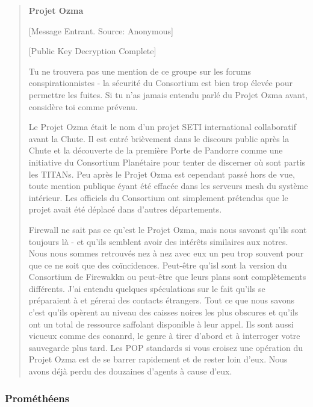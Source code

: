                                              \begin{quotation} \textbf{Projet Ozma} 

                                                [Message Entrant. Source: Anonymous] 

                                                [Public Key Decryption Complete] 

                                                Tu ne trouvera pas une mention de ce groupe sur les forums conspirationnistes - la sécurité du Consortium est bien trop élevée pour permettre les fuites. Si tu n'as jamais entendu parlé du Projet Ozma avant, considère toi comme prévenu. 

                                                Le Projet Ozma était le nom d'un projet SETI international collaboratif avant la Chute. Il est entré brièvement dans le discours public après la Chute et la découverte de la première Porte de Pandorre  comme une initiative du Consortium Planétaire pour tenter de discerner où sont partis les TITANs. Peu après le Projet Ozma est cependant passé hors de vue, toute mention publique éyant été effacée dans les serveurs mesh du système intérieur. Les officiels du Consortium ont simplement prétendus que le projet avait été déplacé dans d'autres départements. 

                                                Firewall ne sait pas ce qu'est le Projet Ozma, mais nous savonst qu'ils sont toujours là - et qu'ils semblent avoir des intérêts similaires aux notres. Nous nous sommes retrouvés nez à nez avec eux un peu trop souvent pour que ce ne soit que des coïncidences. Peut-être qu'isl sont la version du Consortium de Firewakkn ou peut-être que leurs plans sont complètements différents. J'ai entendu quelques spéculations sur le fait qu'ils se préparaient à et gérerai des contacts étrangers. Tout ce que nous savons c'est qu'ils opèrent au niveau des caisses noires les plus obscures et qu'ils ont un total de ressource saffolant disponible à leur appel. Ils sont aussi vicueux comme des conanrd, le genre à tirer d'abord et à interroger votre sauvegarde plus tard. Les POP standards si vous croisez une opération du Projet Ozma est de se barrer rapidement et de rester loin d'eux. Nous avons déjà perdu des douzaines d'agents à cause d'eux. \end{quotation} 

                                                \subsubsection{Prométhéens} \label{sec:prometheans} 


